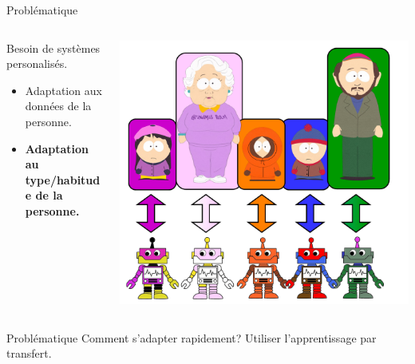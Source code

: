 \documentclass[french]{beamer}
\begin{document}
    \begin{frame}{Problématique}
        \begin{columns}
            \begin{column}{0.5\textwidth}
                Besoin de systèmes personalisés.
                \begin{itemize}
                    \item Adaptation aux données de la personne.
                    \item \textbf{Adaptation au type/habitude de la personne.}
                \end{itemize}
            \end{column}
            \begin{column}{0.5\textwidth}  %
                \begin{center}
                    \includegraphics[width=1.0\textwidth]{img/adap1.pdf}
                \end{center}
            \end{column}
        \end{columns}

        \pause
        \begin{alertblock}{Problématique}
            Comment s'adapter rapidement? Utiliser l'apprentissage par transfert.
        \end{alertblock}

    \end{frame}
\end{document}

